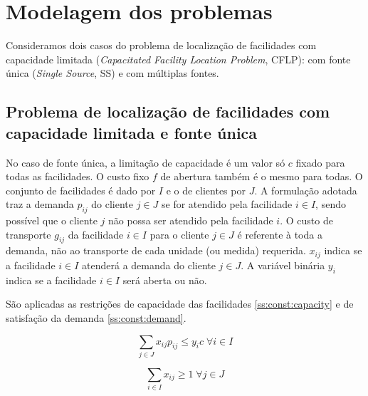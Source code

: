 \documentclass[]{article}
\title{}
\begin{document}
\maketitle

\begin{abstract}

\end{abstract}

\section{Modelagem dos problemas}

	Consideramos dois casos do problema de localização de facilidades com capacidade limitada 
	(\textit{Capacitated Facility Location Problem}, CFLP):
	com fonte única (\textit{Single Source}, SS) 
	e com múltiplas fontes. 
	
	\subsection{Problema de localização de facilidades com capacidade limitada e fonte única}
	
	No caso de fonte única, a limitação de capacidade é um valor só $c$ fixado para todas as facilidades.
	O custo fixo $f$ de abertura também é o mesmo para todas.
	O conjunto de facilidades é dado por $I$ e o de clientes por $J$.
	A formulação adotada traz a demanda $p_{ij}$ do cliente $j \in J$ se for atendido pela facilidade $i \in I$, 
	sendo possível que o cliente $j$ não possa ser atendido pela facilidade $i$.
	O custo de transporte $g_{ij}$ da facilidade $i \in I$ para o cliente $j \in J$ é referente à toda a demanda, não ao transporte de cada unidade (ou medida) requerida.
	$x_{ij}$ indica se a facilidade $i \in I$ atenderá a demanda do cliente $j \in J$.
	A variável binária $y_i$ indica se a facilidade $i \in I$ será aberta ou não.
	
	São aplicadas as restrições de capacidade das facilidades \ref{ss:const:capacity} e de satisfação da demanda \ref{ss:const:demand}.
	
	\begin{equation}
		\label{ss:const:capacity}		
		\sum_{j \in J} x_{ij} p_{ij} \le y_i c 
		\;
		\forall i \in I
	\end{equation}	

	\begin{equation}
		\label{ss:const:demand}		
		\sum_{i \in I} x_{ij} \ge 1 
		\;
		\forall j \in J
	\end{equation}
\end{document}
